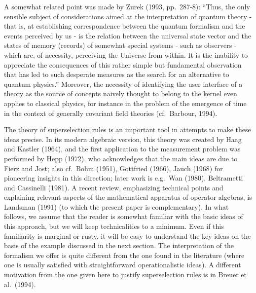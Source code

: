 A somewhat related  point was made   by Zurek  (1993, pp.\ 287-8): ``Thus, the
only sensible
subject of considerations aimed at the interpretation of quantum theory - that
is, at establishing
correspondence between the quantum formalism and the events perceived by us -
is the relation
between the universal state vector and the states of memory (records) of
somewhat special systems -
such as observers - which are, of necessity, perceiving the Universe from
within. It is the
inability to appreciate the consequences of this rather simple but fundamental
observation that has
led to such desperate measures as the search for an alternative to quantum
physics.''
 Moreover,
the necessity of identifying the user interface of a theory as the source of
concepts naively
thought to belong to the kernel even applies to classical physics, for instance
in the problem of the
emergence of time in the context of  generally covariant field theories (cf.\
Barbour, 1994).

The theory of superselection rules is an important tool in attempts to make
these ideas precise. In
its modern algebraic version, this theory was created by Haag and Kastler
(1964), and the first
application to the measurement problem was performed by Hepp (1972), who
acknowledges that the
main ideas are due to Fierz and Jost; also cf.\  Bohm (1951), Gottfried (1966),
Jauch (1968) for
pioneering insights in this direction;
later work   is e.g.\ Wan (1980), Beltrametti and Cassinelli (1981). A recent
review, emphasizing
technical points and explaining relevant aspects of the mathematical apparatus
of operator algebras,
is Landsman (1991) (to which the present paper is complementary). In what
follows, we assume that the
reader is somewhat familiar with the basic ideas of this approach, but we will
keep technicalities to
a minimum.  Even if this familiarity is marginal or rusty, it will be easy to
understand the key
ideas on the basis of the example discussed in the next section.
The interpretation of the formalism we offer is quite different from the one
found in the literature
(where one is usually satisfied with straightforward operationalistic ideas). A
different motivation
from the one given here to justify superselection rules is in Breuer et al.\
(1994).

